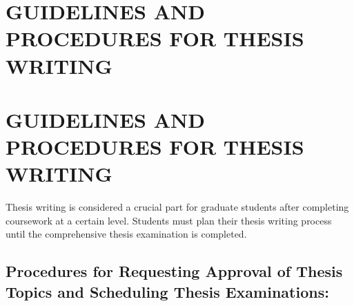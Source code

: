 \appendix

\chapter{GUIDELINES AND PROCEDURES FOR THESIS WRITING}
\thispagestyle{plain}
\clearpage

\chapter*{GUIDELINES AND PROCEDURES FOR THESIS WRITING}

Thesis writing is considered a crucial part for graduate students after completing coursework at a certain level. Students must plan their thesis writing process until the comprehensive thesis examination is completed.

\section*{Procedures for Requesting Approval of Thesis Topics and Scheduling Thesis Examinations:}

